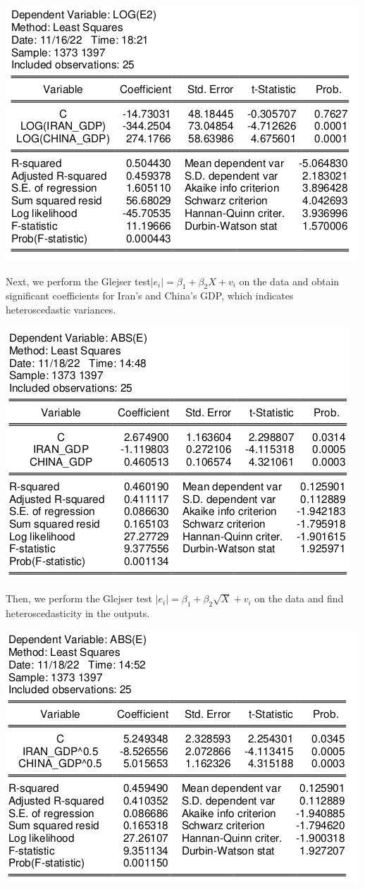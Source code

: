 \documentclass[12pt, letterpaper, twoside]{article}
\begin{document}
        \includegraphics[width=.6\textwidth,height=.6\textwidth,keepaspectratio,center]{11.png}

Next, we perform the Glejser test\(\left|e_{i}  \right|=\beta_{1}+\beta_{2}X+v_{i}\) on the data and obtain significant coefficients for Iran's and China's GDP, which indicates heteroscedastic variances.

        \includegraphics[width=.6\textwidth,height=.6\textwidth,keepaspectratio,center]{12.png}

Then, we perform the Glejser test \(\left|e_{i}  \right|=\beta_{1}+\beta_{2}\sqrt{X}+v_{i}\) on the data and find heteroscedasticity in the outputs.

        \includegraphics[width=.6\textwidth,height=.6\textwidth,keepaspectratio,center]{13.png}
\end{document}
